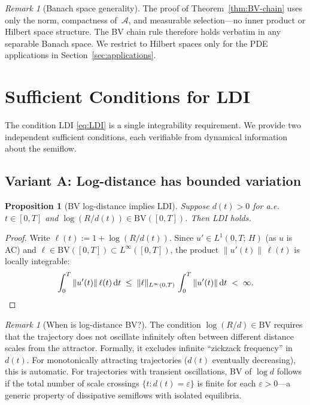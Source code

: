 \documentclass[12pt,a4paper]{article}
\theoremstyle{definition}
\theoremstyle{plain}
\newtheorem{proposition}[definition]{Proposition}
\theoremstyle{remark}
\newtheorem{remark}[definition]{Remark}
\newcommand{\BV}{\mathrm{BV}}
\begin{document}
\begin{remark}[Banach space generality]
\label{rem:banach}
The proof of Theorem~\ref{thm:BV-chain} uses only the norm,
compactness of~$\mathcal{A}$, and measurable selection---no
inner product or Hilbert space structure.  The BV chain rule
therefore holds verbatim in any separable Banach space.  We
restrict to Hilbert spaces only for the PDE applications in
Section~\ref{sec:applications}.
\end{remark}


\section{Sufficient Conditions for LDI}
\label{sec:sufficient}

The condition LDI \eqref{eq:LDI} is a single integrability
requirement.  We provide two independent sufficient conditions,
each verifiable from dynamical information about the semiflow.

\subsection{Variant A: Log-distance has bounded variation}

\begin{proposition}[BV log-distance implies LDI]
\label{prop:variant-A}
Suppose $d(t) > 0$ for a.e.\ $t \in [0,T]$ and
$\log(R/d(t)) \in \BV([0,T])$.  Then LDI holds.
\end{proposition}

\begin{proof}
Write $\ell(t) := 1 + \log(R/d(t))$.  Since $u' \in L^1(0,T;\,H)$
(as $u$ is AC) and $\ell \in \BV([0,T]) \subset
L^\infty([0,T])$, the product
$\|u'(t)\|\,\ell(t)$ is locally integrable:
\[
  \int_0^T \|u'(t)\|\,\ell(t)\,\mathrm{d}t
  \;\le\;
  \|\ell\|_{L^\infty(0,T)}\,\int_0^T \|u'(t)\|\,\mathrm{d}t
  \;<\; \infty.  \qedhere
\]
\end{proof}

\begin{remark}[When is log-distance BV?]
\label{rem:log-BV}
The condition $\log(R/d) \in \BV$ requires that the trajectory
does not oscillate infinitely often between different distance
scales from the attractor.  Formally, it excludes infinite
``zickzack frequency'' in $d(t)$.  For monotonically attracting
trajectories ($d(t)$ eventually decreasing), this is automatic.
For trajectories with transient oscillations, BV of $\log d$
follows if the total number of scale crossings
$\{t : d(t) = \varepsilon\}$ is finite for each
$\varepsilon > 0$---a generic property of dissipative semiflows
with isolated equilibria.
\end{remark}
\end{document}

